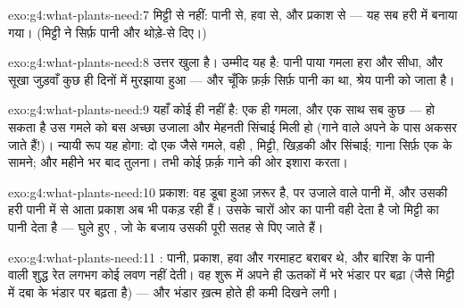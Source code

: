 \begin{solution}{exo:g4:what-plants-need:7}
मिट्टी से नहीं: पानी से, हवा से, और  प्रकाश से --- यह सब हरी
 में बनाया गया। (मिट्टी ने सिर्फ़ पानी और थोड़े-से 
दिए।)
\end{solution}

\begin{solution}{exo:g4:what-plants-need:8}
उत्तर खुला है। उम्मीद यह है: पानी पाया गमला हरा और सीधा, और सूखा
जुड़वाँ कुछ ही दिनों में मुरझाया हुआ --- और चूँकि फ़र्क़ सिर्फ़ पानी का
था, श्रेय पानी को जाता है।
\end{solution}

\begin{solution}{exo:g4:what-plants-need:9}
यहाँ कोई  ही नहीं है: एक ही गमला, और एक साथ सब कुछ --- हो सकता
है उस गमले को बस अच्छा उजाला और मेहनती सिंचाई मिली हो (गाने वाले अपने
 के पास अकसर जाते हैं!)। न्यायी रूप यह होगा: दो एक जैसे गमले, वही
, मिट्टी, खिड़की और सिंचाई; गाना सिर्फ़ एक के सामने; और महीने भर बाद
तुलना। तभी कोई फ़र्क़ गाने की ओर इशारा करता।
\end{solution}

\begin{solution}{exo:g4:what-plants-need:10}
प्रकाश: वह डूबा हुआ ज़रूर है, पर उजाले वाले पानी में, और उसकी हरी
 पानी में से आता प्रकाश अब भी पकड़ रही हैं। उसके चारों ओर
का पानी वही देता है जो मिट्टी का पानी देता है --- घुले हुए ,
जो  के बजाय उसकी पूरी सतह से पिए जाते हैं।
\end{solution}

\begin{solution}{exo:g4:what-plants-need:11}
: पानी, प्रकाश, हवा और गरमाहट बराबर थे, और बारिश के पानी वाली
शुद्ध रेत लगभग कोई लवण नहीं देती। वह शुरू में अपने ही ऊतकों में भरे
भंडार पर बढ़ा (जैसे मिट्टी में दबा   के भंडार पर बढ़ता है) ---
और भंडार ख़त्म होते ही कमी दिखने लगी।
\end{solution}
